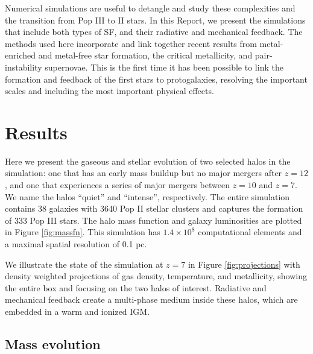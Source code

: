 \documentclass[12pt]{article}
\begin{document}
Numerical simulations are useful to detangle and study these
complexities and the transition from Pop III to II stars.  In this
Report, we present the simulations that include both types of SF, and
their radiative and mechanical feedback.  The methods used here
incorporate and link together recent results from metal-enriched and
metal-free star formation, the critical metallicity, and
pair-instability supernovae.  This is the first time it has been
possible to link the formation and feedback of the first stars to
protogalaxies, resolving the important scales and including the most
important physical effects.

\section*{Results}
\label{sec:results}

Here we present the gaseous and stellar evolution of two selected
halos in the simulation: one that has an early mass buildup but no
major mergers after $z=12$, and one that experiences a series of major
mergers between $z=10$ and $z=7$.  We name the halos ``quiet'' and
``intense'', respectively.  The entire simulation contains 38 galaxies
with 3640 Pop II stellar clusters and captures the formation of 333
Pop III stars.  The halo mass function and galaxy luminosities are
plotted in Figure \ref{fig:massfn}.  This simulation has $1.4 \times
10^8$ computational elements and a maximal spatial resolution of 0.1
pc.


We illustrate the state of the simulation at $z=7$ in Figure
\ref{fig:projections} with density weighted projections of gas
density, temperature, and metallicity, showing the entire box and
focusing on the two halos of interest.  Radiative and mechanical
feedback create a multi-phase medium inside these halos, which are
embedded in a warm and ionized IGM.

\subsection*{Mass evolution}
\label{sec:halo}

\end{document}
